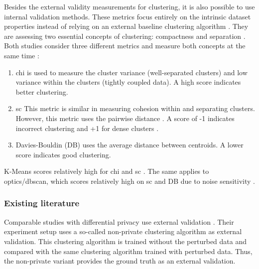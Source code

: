 Besides the external validity measurements for clustering, it is also possible to use internal validation methods.
These metrics focus entirely on the intrinsic dataset properties instead of relying on an external baseline clustering algorithm \citep{craenendonck_using_nodate}.
They are assessing two essential concepts of clustering: compactness and separation \citep{hassani_using_2017}.
Both studies consider three different metrics and measure both concepts at the same time \citep{hassani_using_2017}:
\begin{enumerate}
    \item \gls{chi} \citep{calinski_dendrite_1974} is used to measure the cluster variance (well-separated clusters) and low variance within the clusters (tightly coupled data). A high score indicates better clustering.
    \item \gls{sc} \citep{rousseeuw_silhouettes_1987} This metric is similar in measuring cohesion within and separating clusters.
          However, this metric uses the pairwise distance \cite{hassani_using_2017}.
          A score of -1 indicates incorrect clustering and +1 for dense clusters \cite{rousseeuw_silhouettes_1987}.
    \item Davies-Bouldin (DB) \citep{davies_cluster_1979} uses the average distance between centroids. A lower score indicates good clustering.
\end{enumerate}

K-Means scores relatively high for \gls{chi} \citep{craenendonck_using_nodate,hassani_using_2017} and \gls{sc} \citep{craenendonck_using_nodate}.
The same applies to \gls{optics}/\gls{dbscan}, which scores relatively high on \gls{sc} and DB due to noise sensitivity \citep{craenendonck_using_nodate}.

\subsubsection{Existing literature}
Comparable studies with differential privacy use external validation \citep{xia_distributed_2020, sun_privbv_2022}.
Their experiment setup uses a so-called non-private clustering algorithm as external validation.
This clustering algorithm is trained without the perturbed data and compared with the same clustering algorithm trained with perturbed data.
Thus, the non-private variant provides the ground truth as an external validation.

